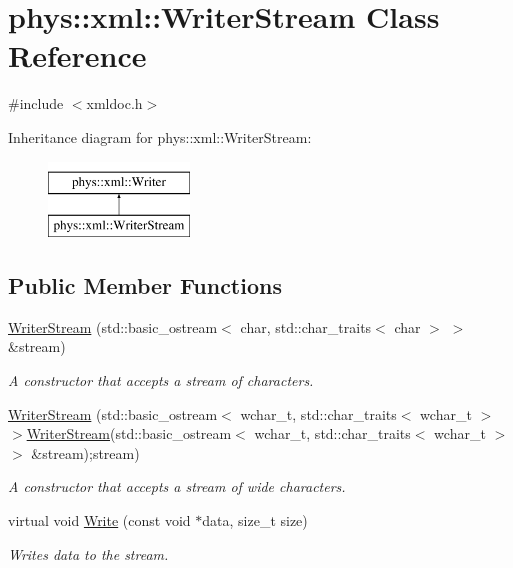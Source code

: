 \hypertarget{classphys_1_1xml_1_1WriterStream}{
\section{phys::xml::WriterStream Class Reference}
\label{d5/d6f/classphys_1_1xml_1_1WriterStream}
}


{\ttfamily \#include $<$xmldoc.h$>$}

Inheritance diagram for phys::xml::WriterStream:\begin{figure}[H]
\begin{center}
\leavevmode
\includegraphics[height=2.000000cm]{d5/d6f/classphys_1_1xml_1_1WriterStream}
\end{center}
\end{figure}
\subsection*{Public Member Functions}
\begin{DoxyCompactItemize}
\item 
\hyperlink{classphys_1_1xml_1_1WriterStream_ae170ab7c429b6f7149d3540243329dfa}{WriterStream} (std::basic\_\-ostream$<$ char, std::char\_\-traits$<$ char $>$ $>$ \&stream)
\begin{DoxyCompactList}\small\item\em A constructor that accepts a stream of characters. \item\end{DoxyCompactList}\item 
\hyperlink{classphys_1_1xml_1_1WriterStream_a956ab44aab151867738a77c42de35495}{WriterStream} (std::basic\_\-ostream$<$ wchar\_\-t, std::char\_\-traits$<$ wchar\_\-t $>$ $>$\hyperlink{classphys_1_1xml_1_1WriterStream}{WriterStream}(std::basic\_\-ostream$<$ wchar\_\-t, std::char\_\-traits$<$ wchar\_\-t $>$ $>$ \&stream);stream)
\begin{DoxyCompactList}\small\item\em A constructor that accepts a stream of wide characters. \item\end{DoxyCompactList}\item 
virtual void \hyperlink{classphys_1_1xml_1_1WriterStream_a74242c8abe03f6244d3464a663f75de9}{Write} (const void $\ast$data, size\_\-t size)
\begin{DoxyCompactList}\small\item\em Writes data to the stream. \item\end{DoxyCompactList}\end{DoxyCompactItemize}


